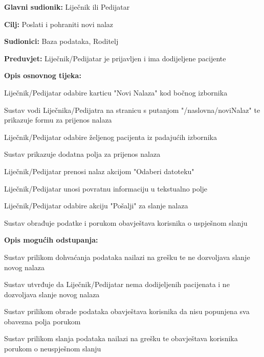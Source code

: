 					
					
					
					
					\noindent {}
					\begin{packed_item}
						
						\item \textbf{Glavni sudionik: }Liječnik ili Pedijatar
						\item  \textbf{Cilj:} Poslati i pohraniti novi nalaz
						\item  \textbf{Sudionici:} Baza podataka, Roditelj
						\item  \textbf{Preduvjet:} Liječnik/Pedijatar je prijavljen i ima dodijeljene pacijente
						\item  \textbf{Opis osnovnog tijeka:}
						
						\item[] \begin{packed_enum}
							\item Liječnik/Pedijatar odabire karticu "Novi Nalaza" kod bočnog izbornika
							\item Sustav vodi Liječnika/Pedijatra na stranicu s putanjom "/naslovna/noviNalaz" te prikazuje formu za prijenos nalaza
							\item Liječnik/Pedijatar odabire željenog pacijenta iz padajućih izbornika
							\item Sustav prikazuje dodatna polja za prijenos nalaza
							\item Liječnik/Pedijatar prenosi nalaz akcijom "Odaberi datoteku"
							\item Liječnik/Pedijatar unosi povratnu informaciju u tekstualno polje
							\item Liječnik/Pedijatar odabire akciju "Pošalji" za slanje nalaza
							\item Sustav obrađuje podatke i porukom obavještava korisnika o uspješnom slanju
						\end{packed_enum}
						
						\item  \textbf{Opis mogućih odstupanja:}
						
						\item[] \begin{packed_item}
							\item[3.a] Sustav prilikom dohvaćanja podataka nailazi na grešku te ne dozvoljava slanje novog nalaza
							
							\item[3.b] Sustav utvrđuje da Liječnik/Pedijatar nema dodijeljenih pacijenata i ne dozvoljava slanje novog nalaza
							
							\item[8.a] Sustav prilikom obrade podataka obavještava korisnika da nisu popunjena sva obavezna polja porukom
							
							\item[8.b] Sustav prilikom slanja podataka nailazi na grešku te obavještava korisnika porukom o neuspješnom slanju
						\end{packed_item}
					\end{packed_item}
					
